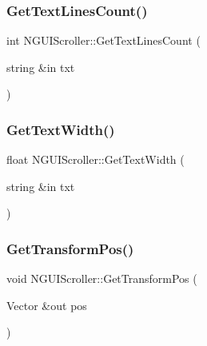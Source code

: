\hypertarget{class_n_g_u_i_scroller_a8d7fa4b42fe883712eba894ea34fb8c7}{}\label{class_n_g_u_i_scroller_a8d7fa4b42fe883712eba894ea34fb8c7} 
\subsubsection{\texorpdfstring{Get\+Text\+Lines\+Count()}{GetTextLinesCount()}}
{\footnotesize\ttfamily int N\+G\+U\+I\+Scroller\+::\+Get\+Text\+Lines\+Count (\begin{DoxyParamCaption}\item[{string \&in}]{txt }\end{DoxyParamCaption})}

\hypertarget{class_n_g_u_i_scroller_a45ecf196597209676c51b949dd92a7f5}{}\label{class_n_g_u_i_scroller_a45ecf196597209676c51b949dd92a7f5} 
\subsubsection{\texorpdfstring{Get\+Text\+Width()}{GetTextWidth()}}
{\footnotesize\ttfamily float N\+G\+U\+I\+Scroller\+::\+Get\+Text\+Width (\begin{DoxyParamCaption}\item[{string \&in}]{txt }\end{DoxyParamCaption})}

\hypertarget{class_n_g_u_i_scroller_a72eb74327e18d24c40b751dd6938ab71}{}\label{class_n_g_u_i_scroller_a72eb74327e18d24c40b751dd6938ab71} 
\subsubsection{\texorpdfstring{Get\+Transform\+Pos()}{GetTransformPos()}}
{\footnotesize\ttfamily void N\+G\+U\+I\+Scroller\+::\+Get\+Transform\+Pos (\begin{DoxyParamCaption}\item[{Vector \&out}]{pos }\end{DoxyParamCaption})}

